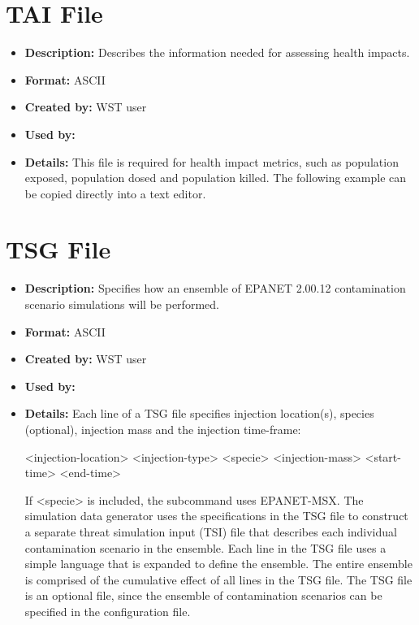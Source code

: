 \section{TAI File}\label{formats_taiFile}
\begin{itemize}
\item {\bfseries Description:} Describes the information needed for assessing health impacts.
\item {\bfseries Format:} ASCII 
\item {\bfseries Created by:} WST user 
\item {\bfseries Used by:}  
\item {\bfseries Details:} This file is required for health impact metrics, such as population exposed, population 
dosed and population killed. 
The following example can be copied directly into a text editor. 
\end{itemize}


\section{TSG File}\label{formats_tsgFile}
\begin{itemize}
\item {\bfseries Description:} Specifies how an ensemble of EPANET 2.00.12 contamination scenario simulations will be performed. 
\item {\bfseries Format:} ASCII 
\item {\bfseries Created by:} WST user 
\item {\bfseries Used by:}  
\item {\bfseries Details:} Each line of a TSG file specifies injection location(s), species (optional), 
injection mass and the injection time-\/frame:
\begin{unknownListing}
   <injection-location> <injection-type> <specie> <injection-mass> <start-time> <end-time>
\end{unknownListing}	
If <specie> is included, the  subcommand uses EPANET-MSX. The simulation data generator 
uses the specifications in the TSG file to construct a separate threat simulation input (TSI) 
file that describes each individual contamination scenario in the ensemble. Each line in the TSG file 
uses a simple language that is expanded to define the ensemble. The entire ensemble is 
comprised of the cumulative effect of all lines in the TSG file. The TSG file is an optional file, 
since the ensemble of contamination scenarios can be specified in the configuration file.
\end{itemize}



